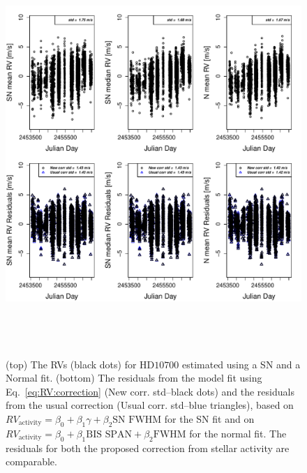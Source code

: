 \documentclass{aa}
\begin{document}
\begin{figure} 
\begin{center}
\includegraphics[height = 6in]{NEW_CORRECTIONHD10700_[3]CorrectionActivity_RadialVelocity_vs_time.pdf} 
   \caption{(top) The RVs (black dots) for $\text{HD}10700$ estimated using a SN and a Normal fit.
 (bottom) The residuals from the model fit using Eq.~\ref{eq:RV:correction} (New corr. std--black dots) and the residuals from the usual correction (Usual corr. std--blue triangles), based on $RV_{\text{activity}}=\beta_0+\beta_1 \gamma + \beta_2 \text{SN FWHM}$ for the SN fit and on $RV_{\text{activity}}=\beta_0+\beta_1 \text{BIS SPAN} + \beta_2 \text{FWHM}$ for the normal fit. The residuals for both the proposed correction from stellar activity are comparable.}
   \label{fig:HD10700:correctionRV}
\end{center}
\end{figure}
\end{document}
